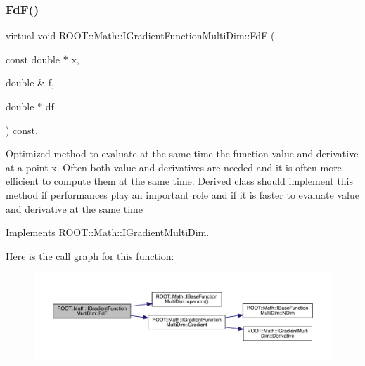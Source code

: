 \subsubsection{\texorpdfstring{FdF()}{FdF()}\hspace{0.1cm}{\footnotesize\ttfamily [2/2]}}
{\footnotesize\ttfamily virtual void R\+O\+O\+T\+::\+Math\+::\+I\+Gradient\+Function\+Multi\+Dim\+::\+FdF (\begin{DoxyParamCaption}\item[{const double $\ast$}]{x,  }\item[{double \&}]{f,  }\item[{double $\ast$}]{df }\end{DoxyParamCaption}) const\hspace{0.3cm}{\ttfamily [inline]}, {\ttfamily [virtual]}}

Optimized method to evaluate at the same time the function value and derivative at a point x. Often both value and derivatives are needed and it is often more efficient to compute them at the same time. Derived class should implement this method if performances play an important role and if it is faster to evaluate value and derivative at the same time 

Implements \mbox{\hyperlink{classROOT_1_1Math_1_1IGradientMultiDim_ad8d0e31b786327014524483a708d8f82}{R\+O\+O\+T\+::\+Math\+::\+I\+Gradient\+Multi\+Dim}}.

Here is the call graph for this function\+:
\nopagebreak
\begin{figure}[H]
\begin{center}
\leavevmode
\includegraphics[width=350pt]{da/d1a/classROOT_1_1Math_1_1IGradientFunctionMultiDim_a58cefd2806ec7b9d389911800ed60386_cgraph}
\end{center}
\end{figure}
\mbox{\label{classROOT_1_1Math_1_1IGradientFunctionMultiDim_ab65a713d2637c69b334d2119ef4f0e26}} 
